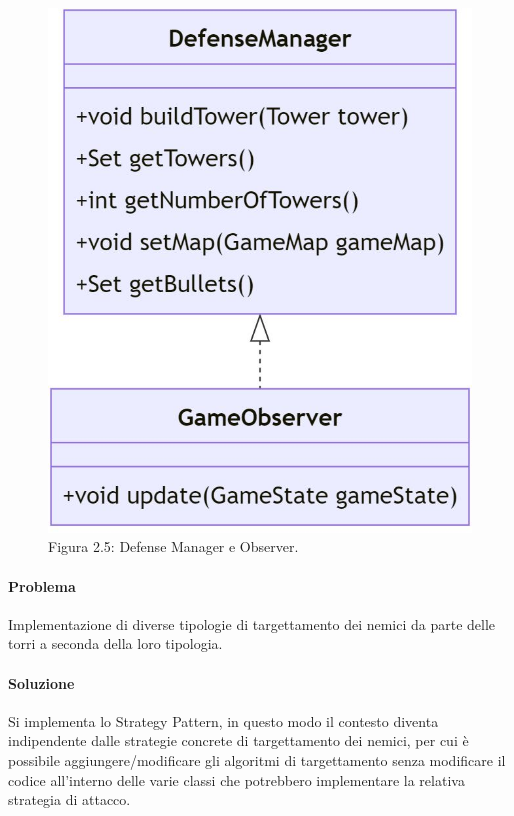 \documentclass[a4paper,12pt]{report}
\begin{document}
\begin{figure}[H]
    \centering
    \includegraphics[width=0.8\linewidth]{defense_observer}
    \caption{Figura 2.5: Defense Manager e Observer.}
    \label{fig:defense_observer}
\end{figure}

\vspace{50mm}

\paragraph{Problema}
Implementazione di diverse tipologie di targettamento dei nemici da parte delle torri a seconda della loro tipologia.
\paragraph{Soluzione}
Si implementa lo Strategy Pattern, in questo modo il contesto diventa indipendente dalle strategie concrete di targettamento dei nemici, per cui è possibile aggiungere/modificare gli algoritmi di targettamento senza modificare il codice all'interno delle varie classi che potrebbero implementare la relativa strategia di attacco.
\end{document}
